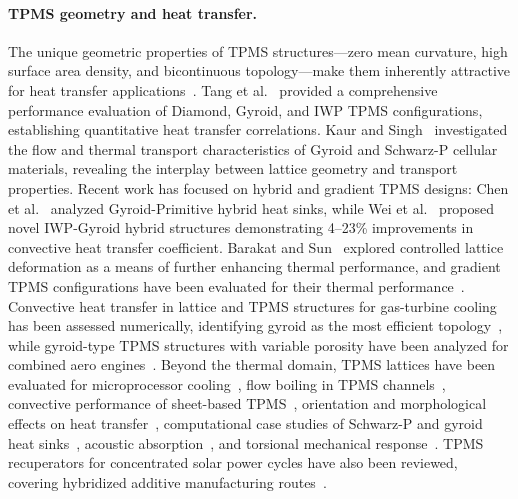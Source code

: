 \paragraph{TPMS geometry and heat transfer.}
The unique geometric properties of TPMS structures---zero mean curvature, high surface area density, and bicontinuous topology---make them inherently attractive for heat transfer applications~\cite{jung2006fluid,tang2023analysis}. Tang et al.~\cite{tang2023analysis} provided a comprehensive performance evaluation of Diamond, Gyroid, and IWP TPMS configurations, establishing quantitative heat transfer correlations. Kaur and Singh~\cite{kaur2021flow} investigated the flow and thermal transport characteristics of Gyroid and Schwarz-P cellular materials, revealing the interplay between lattice geometry and transport properties. Recent work has focused on hybrid and gradient TPMS designs: Chen et al.~\cite{chen2026comprehensive} analyzed Gyroid-Primitive hybrid heat sinks, while Wei et al.~\cite{wei2026convective} proposed novel IWP-Gyroid hybrid structures demonstrating 4--23\% improvements in convective heat transfer coefficient. Barakat and Sun~\cite{barakat2024controlling} explored controlled lattice deformation as a means of further enhancing thermal performance, and gradient TPMS configurations have been evaluated for their thermal performance~\cite{an2026performance}. Convective heat transfer in lattice and TPMS structures for gas-turbine cooling has been assessed numerically, identifying gyroid as the most efficient topology~\cite{casini2024numerical}, while gyroid-type TPMS structures with variable porosity have been analyzed for combined aero engines~\cite{sun2025numerical}. Beyond the thermal domain, TPMS lattices have been evaluated for microprocessor cooling~\cite{ifa2026diamond}, flow boiling in TPMS channels~\cite{hong2026flow,hong2026experimental}, convective performance of sheet-based TPMS~\cite{huo2026convective}, orientation and morphological effects on heat transfer~\cite{son2024effects,son2025effect}, computational case studies of Schwarz-P and gyroid heat sinks~\cite{banas2025evaluation,mian2025computational,nirala2025computational}, acoustic absorption~\cite{godakawela2025sound}, and torsional mechanical response~\cite{skibar2026comparative}. TPMS recuperators for concentrated solar power cycles have also been reviewed, covering hybridized additive manufacturing routes~\cite{letlhare2025hybridized}.

